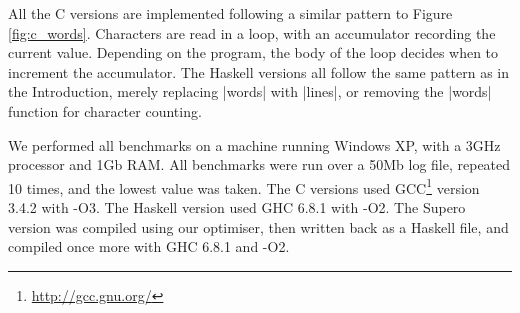 All the C versions are implemented following a similar pattern to Figure \ref{fig:c_words}. Characters are read in a loop, with an accumulator recording the current value. Depending on the program, the body of the loop decides when to increment the accumulator. The Haskell versions all follow the same pattern as in the Introduction, merely replacing |words| with |lines|, or removing the |words| function for character counting.

We performed all benchmarks on a machine running Windows XP, with a 3GHz processor and 1Gb RAM. All benchmarks were run over a 50Mb log file, repeated 10 times, and the lowest value was taken. The C versions used GCC\footnote{\url{http://gcc.gnu.org/}} version 3.4.2 with -O3. The Haskell version used GHC 6.8.1 with -O2. The Supero version was compiled using our optimiser, then written back as a Haskell file, and compiled once more with GHC 6.8.1 and -O2.

